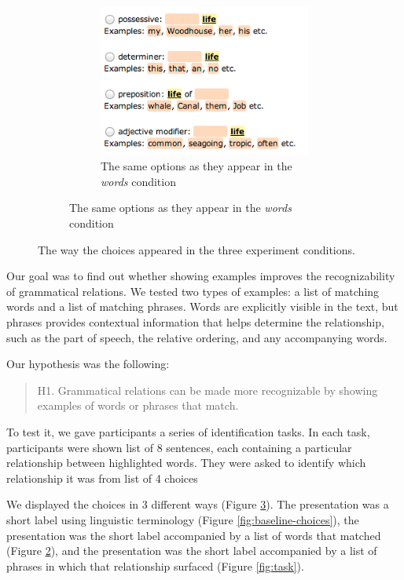 \begin{figure}
\begin{subfigure}{0.7\columnwidth}
	    \begin{subfigure}{0.7\columnwidth}
	    	\centering
	    	\includegraphics[width=0.9\columnwidth]{fig/words-choices}
	        \caption {The same options as they appear in the \emph{words} condition \label{fig:words-choices}}
	    \end{subfigure}
	\end{subfigure}
\caption{\label{fig:choices} The way the choices appeared in the three experiment conditions.}
\end{figure}

Our goal was to find out whether showing examples improves the recognizability of grammatical relations. We tested two types of examples: a list of matching words and a list of matching phrases. Words are explicitly visible in the text, but phrases provides contextual information that helps determine the relationship, such as the part of speech, the relative ordering, and any accompanying words.

Our hypothesis was the following:
\begin{quote}
	H1. Grammatical relations can be made more recognizable by showing examples of words or phrases that match.
\end{quote}

To test it, we gave participants a series of identification tasks. In each task, participants were shown list of 8 sentences, each containing a particular relationship between highlighted words. They were asked to identify which relationship it was from list of 4 choices

We displayed the choices in 3 different ways (Figure \ref{fig:choices}). The  presentation was a short label using linguistic terminology (Figure \ref{fig:baseline-choices}), the  presentation was the short label accompanied by a list of words that matched (Figure \ref{fig:words-choices}), and the  presentation was the short label accompanied by a list of phrases in which that relationship surfaced (Figure \ref{fig:task}).

